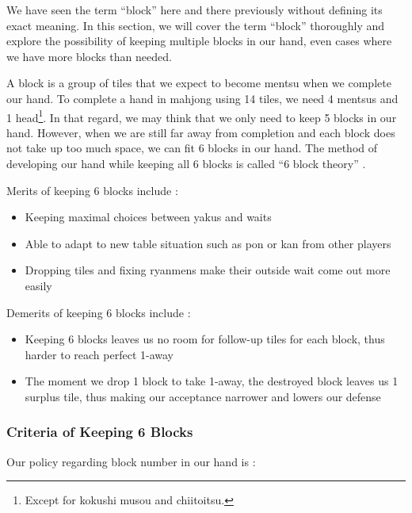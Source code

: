 \documentclass[12pt]{article}
\begin{document}
We have seen the term ``block'' here and there previously without defining its exact meaning. In this section, we will cover the term ``block'' thoroughly and explore the possibility of keeping multiple blocks in our hand, even cases where we have more blocks than needed.

A block is a group of tiles that we expect to become mentsu when we complete our hand. To complete a hand in mahjong using 14 tiles, we need 4 mentsus and 1 head\footnote{Except for kokushi musou and chiitoitsu.}. In that regard, we may think that we only need to keep 5 blocks in our hand. However, when we are still far away from completion and each block does not take up too much space, we can fit 6 blocks in our hand. The method of developing our hand while keeping all 6 blocks is called ``6 block theory'' \citep[][p. 16]{uzaku-haikouritsu}.

Merits of keeping 6 blocks include :

\begin{itemize}
\item Keeping maximal choices between yakus and waits
\item Able to adapt to new table situation such as pon or kan from other players
\item Dropping tiles and fixing ryanmens make their outside wait come out more easily
\end{itemize}

Demerits of keeping 6 blocks include :

\begin{itemize}
\item Keeping 6 blocks leaves us no room for follow-up tiles for each block, thus harder to reach perfect 1-away
\item The moment we drop 1 block to take 1-away, the destroyed block leaves us 1 surplus tile, thus making our acceptance narrower and lowers our defense
\end{itemize}

\subsubsection{Criteria of Keeping 6 Blocks}

Our policy regarding block number in our hand is :
\end{document}
